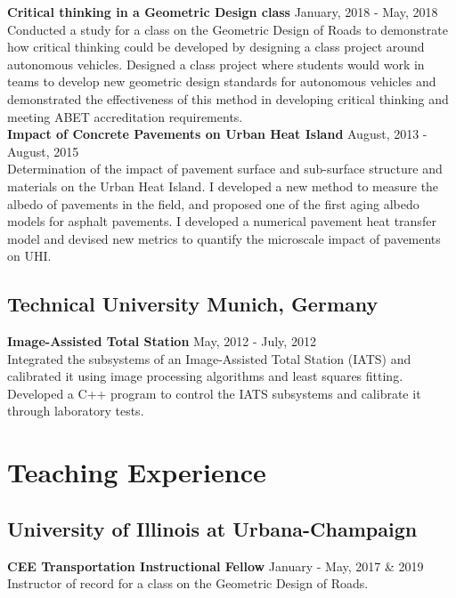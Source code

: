 \documentclass[12pt]{article}
\begin{document}
\textbf{Critical thinking in a Geometric Design class} \hfill January, 2018 - May, 2018\\
Conducted a study for a class on the Geometric Design of Roads to demonstrate how critical thinking could be developed by designing a class project around autonomous vehicles. Designed a class project where students would work in teams to develop new geometric design standards for autonomous vehicles and demonstrated the effectiveness of this method in developing critical thinking and meeting ABET accreditation requirements. \\

\textbf{Impact of Concrete Pavements on Urban Heat Island} \hfill August, 2013 - August, 2015 \\
Determination of the impact of pavement surface and sub-surface structure and materials on the Urban Heat Island. I developed a new method to measure the albedo of pavements in the field, and proposed one of the first aging albedo models for asphalt pavements. I developed a numerical pavement heat transfer model and devised new metrics to quantify the microscale impact of pavements on UHI. \\

\subsection*{Technical University Munich, Germany}
\textbf{Image-Assisted Total Station} \hfill May, 2012 - July, 2012 \\
Integrated the subsystems of an Image-Assisted Total Station (IATS) and calibrated it using image processing algorithms and least squares fitting. Developed a C++ program to control the IATS subsystems and calibrate it through laboratory tests. \\

\section*{Teaching Experience}
\subsection*{University of Illinois at Urbana-Champaign}
\textbf{CEE Transportation Instructional Fellow} \hfill January - May, 2017 \& 2019 \\
Instructor of record for a class on the Geometric Design of Roads.\\
\end{document}
